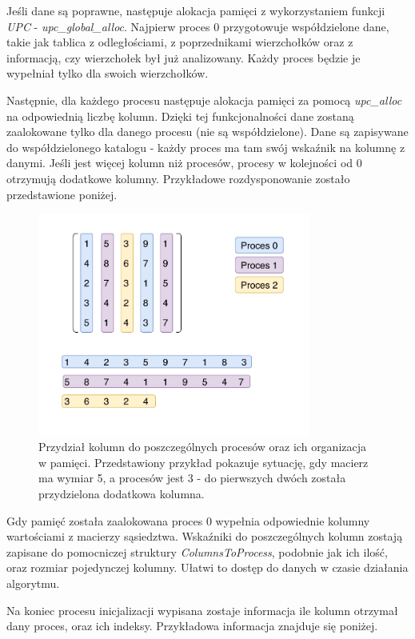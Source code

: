 \documentclass[12pt]{article}
\begin{document}
Jeśli dane są poprawne, następuje alokacja pamięci z wykorzystaniem funkcji \textit{UPC} - \textit{upc\_global\_alloc}. Najpierw proces 0 przygotowuje współdzielone dane, takie jak tablica z odległościami, z poprzednikami wierzchołków oraz z informacją, czy wierzchołek był już analizowany. Każdy proces będzie je wypełniał tylko dla swoich wierzchołków.

Następnie, dla każdego procesu następuje alokacja pamięci za pomocą  \textit{upc\_alloc} na odpowiednią liczbę kolumn. Dzięki tej funkcjonalności dane zostaną zaalokowane tylko dla danego procesu (nie są współdzielone). Dane są zapisywane do współdzielonego katalogu - każdy proces ma tam swój wskaźnik na kolumnę z danymi. Jeśli jest więcej kolumn niż procesów, procesy w kolejności od 0 otrzymują dodatkowe kolumny. Przykładowe rozdysponowanie zostało przedstawione poniżej. 

\begin{figure}[H]
\centering
\includegraphics[width=0.8\textwidth]{data_division.pdf}
\caption{Przydział kolumn do poszczególnych procesów oraz ich organizacja w pamięci. Przedstawiony przykład pokazuje sytuację, gdy macierz ma wymiar 5, a procesów jest 3 - do pierwszych dwóch została przydzielona dodatkowa kolumna.}
\end{figure}

Gdy pamięć została zaalokowana proces 0 wypełnia odpowiednie kolumny wartościami z macierzy sąsiedztwa. Wskaźniki do poszczególnych kolumn zostają zapisane do pomocniczej struktury \textit{ColumnsToProcess}, podobnie jak ich ilość, oraz rozmiar pojedynczej kolumny. Ułatwi to dostęp do danych w czasie działania algorytmu.

Na koniec procesu inicjalizacji wypisana zostaje informacja ile kolumn otrzymał dany proces, oraz ich indeksy. Przykładowa informacja znajduje się poniżej.
\end{document}
